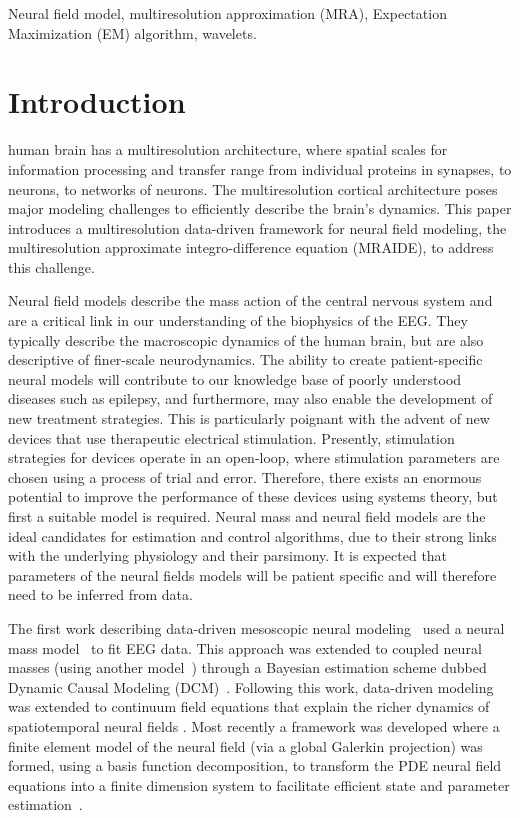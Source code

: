 \documentclass[journal,a4paper]{IEEEtran}
\begin{document}
\begin{IEEEkeywords}
Neural field model, multiresolution approximation (MRA), Expectation Maximization (EM) algorithm, wavelets.
\end{IEEEkeywords}

\IEEEpeerreviewmaketitle

\section{Introduction}
 human brain has a multiresolution architecture, where spatial scales for information processing and transfer range from individual proteins in synapses, to neurons, to networks of neurons. The multiresolution cortical architecture poses major modeling challenges to efficiently describe the brain's dynamics. This paper introduces a multiresolution data-driven framework for neural field modeling, the multiresolution approximate integro-difference equation (MRAIDE), to address this challenge. 

Neural field models describe the mass action of the central nervous system and are a critical link in our understanding of the biophysics of the EEG. They typically describe the macroscopic dynamics of the human brain, but are also descriptive of finer-scale neurodynamics. The ability to create patient-specific neural models will contribute to our knowledge base of poorly understood diseases such as epilepsy, and furthermore, may also enable the development of new treatment strategies. This is particularly poignant with the advent of new devices that use therapeutic electrical stimulation. Presently, stimulation strategies for devices operate in an open-loop, where stimulation parameters are chosen using a process of trial and error. Therefore, there exists an enormous potential to improve the performance of these devices using systems theory, but first a suitable model is required. Neural mass and neural field models are the ideal candidates for estimation and control algorithms, due to their strong links with the underlying physiology and their parsimony. It is expected that parameters of the neural fields models will be patient specific and will therefore need to be inferred from data.

The first work describing data-driven mesoscopic neural modeling~\cite{Valdes1999} used a neural mass model~\cite{LopesDaSilva1976,Zetterberg1978} to fit EEG data. This approach was extended to coupled neural masses (using another model~\cite{Jansen1995}) through a Bayesian estimation scheme dubbed Dynamic Causal Modeling (DCM)~\cite{David2003}. Following this work, data-driven modeling was extended to continuum field equations that explain the richer dynamics of spatiotemporal neural fields \cite{Galka2008,schiff2008kalman,Daunizeau2009}. Most recently a framework was developed where a finite element model of the neural field (via a global Galerkin projection) was formed, using a basis function decomposition, to transform the PDE neural field equations into a finite dimension system to facilitate efficient state and parameter estimation~\cite{Freestone2011}.  
\end{document}
